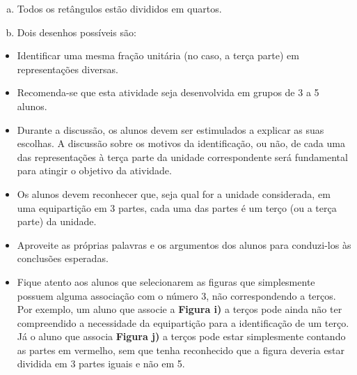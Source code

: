 \begin{multicols}{2}
\begin{solucao}{}{}
\begin{enumerate}[a),wide,labelindent=0pt] %
    \item       Todos os retângulos estão divididos em quartos.
    \item       Dois desenhos possíveis são:
\begin{center}
\end{center}
\end{enumerate} %
\end{solucao}

\end{multicols}
\begin{objetivos}{}{}
\begin{itemize} %
    \item       Identificar uma mesma fração unitária (no caso, a terça parte) em representações diversas.
\end{itemize} %
\end{objetivos}

\begin{orientacoes}

\begin{itemize} %
    \item       Recomenda-se que esta atividade seja desenvolvida em grupos de 3 a 5 alunos.
    \item       Durante a discussão, os alunos devem ser estimulados a explicar as suas escolhas. A discussão sobre os motivos da identificação, ou não, de cada uma das representações à terça parte da unidade correspondente será fundamental para atingir o objetivo da atividade.
    \item       Os alunos devem reconhecer que, seja qual for a unidade considerada, em uma equipartição em 3 partes, cada uma das partes é um terço (ou a terça parte) da unidade.
    \item       Aproveite as próprias palavras e os argumentos dos alunos para conduzi-los às conclusões esperadas.
    \item       Fique atento aos alunos que selecionarem as figuras que simplesmente possuem alguma associação com o número 3, não correspondendo a terços. Por exemplo, um aluno que associe a       {\bf Figura i)} a terços pode ainda não ter compreendido a necessidade da equipartição para a identificação de um terço. Já o aluno que associa       {\bf Figura j)}       a terços pode estar simplesmente contando as partes em vermelho, sem que tenha reconhecido que a figura deveria estar dividida em 3 partes iguais e não em 5.
\end{itemize} %
\end{orientacoes}

